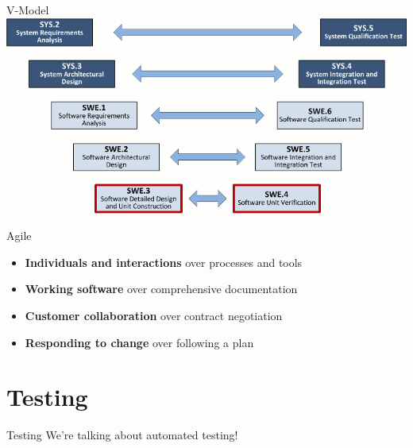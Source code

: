 \documentclass{beamer}
\begin{document}
\begin{frame}{V-Model}
\includegraphics[scale=0.4]{img/VModel.png}
\end{frame}

\begin{frame}{Agile}
\begin{itemize}
  \item \textbf{Individuals and interactions} over processes and tools 
  \item \textbf{Working software} over comprehensive documentation
  \item \textbf{Customer collaboration} over contract negotiation
  \item \textbf{Responding to change} over following a plan
\end{itemize}
\end{frame}

\section{Testing}
\begin{frame}{Testing}
We're talking about automated testing!
\end{frame}
\end{document}
